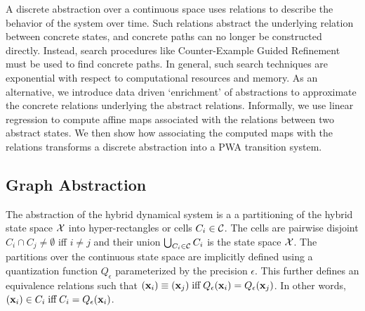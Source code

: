 
A discrete abstraction over a continuous space uses relations to
describe the behavior of the system over time. Such relations abstract
the underlying relation between concrete states, and concrete paths
can no longer be constructed directly. Instead, search procedures
like Counter-Example Guided Refinement must be used to find concrete
paths. In general, such search techniques are exponential with respect to
computational resources and memory. As an alternative, we introduce
data driven `enrichment' of abstractions to approximate the concrete
relations underlying the abstract relations. Informally, we use linear
regression to compute affine maps associated with the relations
between two abstract states. We then show how associating the computed
maps with the relations transforms a discrete abstraction into a PWA
transition system.

\subsection{Graph Abstraction}



The abstraction of the hybrid dynamical system is a a
partitioning of the hybrid state space $\mathcal{X}$ into hyper-rectangles or cells $C_i \in \mathcal{C}$. The cells are
pairwise disjoint $C_i \cap C_j \neq \emptyset$ iff $i \neq j$ and
their union $\bigcup_{C_i\in\mathcal{C}}C_i$ is the state space $\mathcal{X}$. The partitions over
the continuous state space are implicitly defined using a quantization
function $Q_\epsilon$ parameterized by the precision $\epsilon$.
This further defines an equivalence relations such that $(\mathbf{x}_i)
\equiv (\mathbf{x}_j) \;\text{iff}\; Q_\epsilon(\mathbf{x}_i) = Q_\epsilon(\mathbf{x}_j)$.
In other words, $(\mathbf{x}_i) \in C_i \; \text{iff} \; C_i = Q_\epsilon(\mathbf{x}_i)$.

